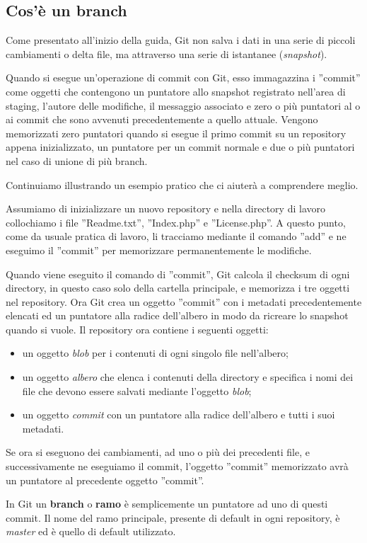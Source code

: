 \subsection{Cos'è un branch}
Come presentato all'inizio della guida, Git non salva i dati in una serie di piccoli cambiamenti o delta file, ma attraverso una serie di istantanee (\textit{snapshot}).

Quando si esegue un'operazione di commit con Git, esso immagazzina i ''commit'' come oggetti che contengono un puntatore allo snapshot registrato nell'area di staging, l'autore delle modifiche, il messaggio associato e zero o più puntatori al o ai commit che sono avvenuti precedentemente a quello attuale. Vengono memorizzati zero puntatori quando si esegue il primo commit su un repository appena inizializzato, un puntatore per un commit normale e due o più puntatori nel caso di unione di più branch.

Continuiamo illustrando un esempio pratico che ci aiuterà a comprendere meglio. 

Assumiamo di inizializzare un nuovo repository e nella directory di lavoro collochiamo i file ''Readme.txt'', ''Index.php'' e ''License.php''. A questo punto, come da usuale pratica di lavoro, li tracciamo mediante il comando ''add'' e ne eseguimo il ''commit'' per memorizzare permanentemente le modifiche.

Quando viene eseguito il comando di ''commit'', Git calcola il checksum di ogni directory, in questo caso solo della cartella principale, e memorizza i tre oggetti nel repository. Ora Git crea un oggetto ''commit'' con i metadati precedentemente elencati ed un puntatore alla radice dell'albero in modo da ricreare lo snapshot quando si vuole. Il repository ora contiene i seguenti oggetti:

\begin{itemize}
\item un oggetto \textit{blob} per i contenuti di ogni singolo file nell'albero;
\item un oggetto \textit{albero} che elenca i contenuti della directory e specifica i nomi dei file che devono essere salvati mediante l'oggetto \textit{blob};
\item un oggetto \textit{commit} con un puntatore alla radice dell'albero e tutti i suoi metadati.
\end{itemize}

Se ora si eseguono dei cambiamenti, ad uno o più dei precedenti file, e successivamente ne eseguiamo il commit, l'oggetto ''commit'' memorizzato avrà un puntatore al precedente oggetto ''commit''.

In Git un \textbf{branch} o \textbf{ramo} è semplicemente un puntatore ad uno di questi commit. Il nome del ramo principale, presente di default in ogni repository, è \textit{master} ed è quello di default utilizzato.
